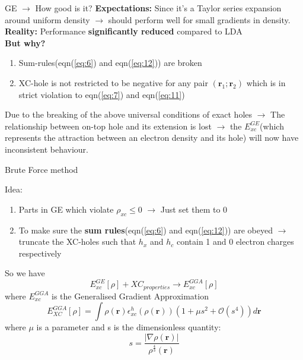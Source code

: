 \documentclass{beamer}
\begin{document}
	\begin{frame}[t]{GE $\rightarrow$ How good is it?}
	 \textbf{Expectations:} Since it's a Taylor series expansion around uniform density $\rightarrow$ should perform well for small gradients in density.\pause \\
	 \vspace{0.2cm}
	 \textbf{Reality:} Performance \textbf{significantly reduced} compared to LDA\pause \\
	 \vspace{0.2cm}
	 \textbf{But why?}\pause
	 \begin{enumerate}
	 \item{Sum-rules(eqn(\ref{eq:6}) and eqn(\ref{eq:12})) are broken}\pause
	 \item{XC-hole is not restricted to be negative for any pair $(\textbf{r}_1;\textbf{r}_2)$ which is in strict violation to eqn(\ref{eq:7}) and eqn(\ref{eq:11})}
	 \end{enumerate}\pause
	 Due to the breaking of the above universal conditions of exact holes $\rightarrow$ The relationship between on-top hole and its extension is lost $\rightarrow$ the $E_{xc}^{GE}$(which represents the attraction between an electron density and its hole) will now have inconsistent behaviour.
	\end{frame}
	
	\begin{frame}[t]{Brute Force method}
	 \begin{block}{Idea:}
	  \begin{enumerate}
	   \item{Parts in GE which violate $\rho_{xc}\leqslant 0$ $\rightarrow$ Just set them to 0}\pause
	   \item{To make sure the \textbf{sum rules}(eqn(\ref{eq:6}) and eqn(\ref{eq:12})) are obeyed $\rightarrow$ truncate the XC-holes such that $h_x$ and $h_c$ contain 1 and 0 electron charges respectively}\pause
	  \end{enumerate}
	 \end{block}
	So we have
	\begin{equation}\label{eq:16}
	E_{xc}^{GE}[\rho] + XC_{properties} \rightarrow E_{xc}^{GGA}[\rho]
	\end{equation}
	where $E_{xc}^{GGA}$ is the Generalised Gradient Approximation
	\begin{equation}\label{eq:17}
	E_{XC}^{GGA}[\rho] = \displaystyle{\int}\rho(\textbf{r})\epsilon_{xc}^h(\rho(\textbf{r}))(1+\mu s^2 + \mathcal{O}(s^4))d\textbf{r}
	\end{equation}
	where $\mu$ is a parameter and s is the dimensionless quantity:
	\begin{equation}\label{eq:18}
	s = \frac{|\nabla\rho(\textbf{r})|}{\rho^{\frac{4}{3}}(\textbf{r})}
	\end{equation}
	\end{frame}
	
\end{document}
